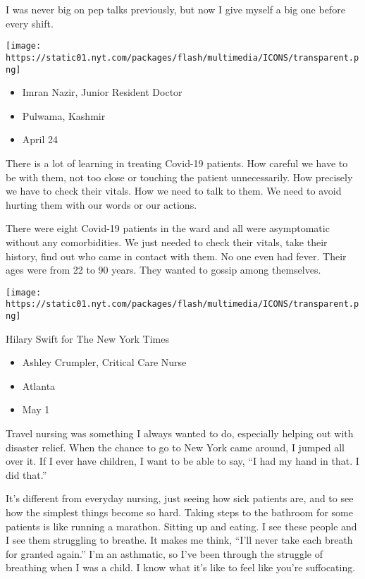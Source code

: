 I was never big on pep talks previously, but now I give myself a big one
before every shift.

\texttt{[image: https://static01.nyt.com/packages/flash/multimedia/ICONS/transparent.png]}

\begin{itemize}
\tightlist
\item
  Imran Nazir, Junior Resident Doctor
\item
  Pulwama, Kashmir
\item
  April 24
\end{itemize}

There is a lot of learning in treating Covid-19 patients. How careful we
have to be with them, not too close or touching the patient
unnecessarily. How precisely we have to check their vitals. How we need
to talk to them. We need to avoid hurting them with our words or our
actions.

There were eight Covid-19 patients in the ward and all were asymptomatic
without any comorbidities. We just needed to check their vitals, take
their history, find out who came in contact with them. No one even had
fever. Their ages were from 22 to 90 years. They wanted to gossip among
themselves.

\texttt{[image: https://static01.nyt.com/packages/flash/multimedia/ICONS/transparent.png]}

Hilary Swift for The New York Times

\begin{itemize}
\tightlist
\item
  Ashley Crumpler, Critical Care Nurse
\item
  Atlanta
\item
  May 1
\end{itemize}

Travel nursing was something I always wanted to do, especially helping
out with disaster relief. When the chance to go to New York came around,
I jumped all over it. If I ever have children, I want to be able to say,
``I had my hand in that. I did that.''

It's different from everyday nursing, just seeing how sick patients are,
and to see how the simplest things become so hard. Taking steps to the
bathroom for some patients is like running a marathon. Sitting up and
eating. I see these people and I see them struggling to breathe. It
makes me think, ``I'll never take each breath for granted again.'' I'm
an asthmatic, so I've been through the struggle of breathing when I was
a child. I know what it's like to feel like you're suffocating.

